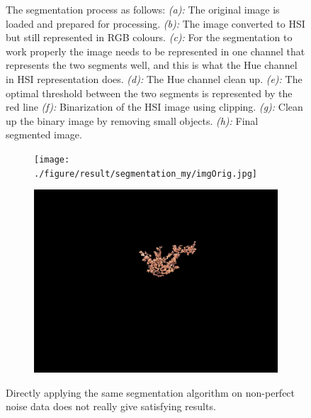\begin{figure}[H]
\begin{subfigure}[b]{0.3\textwidth}
		\caption{}
		\label{fig:seg_h}
    \end{subfigure}
    \caption{The segmentation process as follows: \textit{(a):} The original image is loaded and prepared for processing. \textit{(b):} The image converted to HSI but still represented in RGB colours. \textit{(c):} For the segmentation to work properly the image needs to be represented in one channel that represents the two segments well, and this is what the Hue channel in HSI representation does. \textit{(d):} The Hue channel clean up. \textit{(e):} The optimal threshold between the two segments is represented by the red line  \textit{(f):} Binarization of the HSI image using clipping. \textit{(g):} Clean up the binary image by removing small objects. \textit{(h):} Final segmented image.  }
    \label{fig:1}
\end{figure}


\begin{figure}[H]
    \centering
    \captionsetup[subfigure]{justification=centering}
    \begin{subfigure}[b]{0.47\textwidth}
        \centering
        \texttt{[image: ./figure/result/segmentation\_my/imgOrig.jpg]}
		\caption{}
		\label{fig:seg_a}
    \end{subfigure}
    \begin{subfigure}[b]{0.47\textwidth}
        \centering
        \includegraphics[width=\textwidth]{./figure/result/segmentation_my/imgSeg.png}
        \caption{}
		\label{fig:seg_b}
    \end{subfigure}
    \caption{Directly applying the same segmentation algorithm on non-perfect noise data does not really give satisfying results.}
    \label{fig:result_segmentation_2}
\end{figure}

